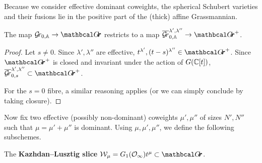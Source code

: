 \documentclass[draft]{article}
\begin{document}
Because we consider effective dominant coweights, the spherical Schubert varieties and their fusions lie in the positive part of the (thick) affine Grassmannian.
% 
\begin{lemma}
\label{le:sphfusispos}
    The map $ \Gr_{0, \AA} \rightarrow \Grth$ restricts to a map $ \overline{\Gr}^{\lambda', \lambda''}_{0, \AA} \rightarrow \Grth^+$.
\end{lemma}
\begin{proof}
    Let $ s \ne 0 $. Since $ \lambda', \lambda'' $ are effective, $ t^{\lambda'}, (t-s)^{\lambda''} \in \Grth^+ $.  Since $\Grth^+$ is closed and invariant under the action of $ G(\mathbb C[t])$,  $ \overline{\Gr}_{0,s}^{\lambda', \lambda''} \subset \Grth^+$.
    
    For the $ s = 0$ fibre, a similar reasoning applies (or we can simply conclude by taking closure).
\end{proof}


Now fix two effective (possibly non-dominant) coweights $ \mu', \mu''$ of sizes $N',N''$ such that $ \mu = \mu' + \mu'' $ is dominant. 
Using $ \mu, \mu', \mu''$, we define the following subschemes.

\begin{definition}
\label{def:klslice}
    The \textbf{Kazhdan--Lusztig slice} $\cW_\mu = G_1(\Oinf) t^\mu \subset \Grth $.  
\end{definition}
% 
\end{document}
